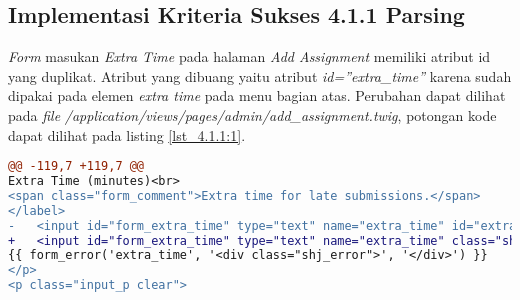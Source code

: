 \subsection{Implementasi Kriteria Sukses 4.1.1 Parsing}
\label{subsec:implementasi_A_4.1.1}

\textit{Form} masukan \textit{Extra Time} pada halaman \textit{Add Assignment} memiliki atribut id yang duplikat. Atribut yang dibuang yaitu atribut \textit{id=''extra\_time''} karena sudah dipakai pada elemen \textit{extra time} pada menu bagian atas. Perubahan dapat dilihat pada \textit{file} \textit{/application/views/pages/admin/add\_assignment.twig}, potongan kode dapat dilihat pada listing \ref{lst_4.1.1:1}.

\begin{lstlisting}[language=diff, caption=Perubahan pada \textit{file} \textit{add\_assignment.twig}, label=lst_4.1.1:1, basicstyle=\ttfamily, frame=single,
columns=fullflexible, keepspaces=true, breaklines=true]
@@ -119,7 +119,7 @@
Extra Time (minutes)<br>
<span class="form_comment">Extra time for late submissions.</span>
</label>
- 	<input id="form_extra_time" type="text" name="extra_time" id="extra_time" class="sharif_input medium" value="{{ edit ? edit_assignment.extra_time|extra_time_formatter : set_value('extra_time') }}" />
+ 	<input id="form_extra_time" type="text" name="extra_time" class="sharif_input medium" value="{{ edit ? edit_assignment.extra_time|extra_time_formatter : set_value('extra_time') }}" />
{{ form_error('extra_time', '<div class="shj_error">', '</div>') }}
</p>
<p class="input_p clear">
\end{lstlisting}